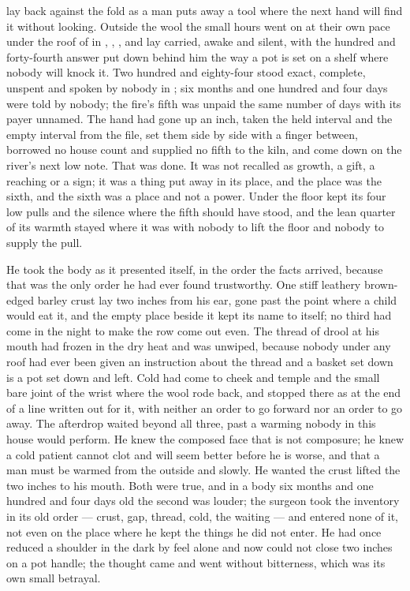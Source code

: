 
 lay back against the fold as a man puts away a tool where the next hand will find it without looking. Outside the wool the small hours went on at their own pace under the roof of  in , , , and  lay carried, awake and silent, with the hundred and forty-fourth answer put down behind him the way a pot is set on a shelf where nobody will knock it. Two hundred and eighty-four stood exact, complete, unspent and spoken by nobody in ; six months and one hundred and four days were told by nobody; the fire's fifth was unpaid the same number of days with its payer unnamed. The hand had gone up an inch, taken the held interval and the empty interval from the file, set them side by side with a finger between, borrowed no house count and supplied no fifth to the kiln, and come down on the river's next low note. That was done. It was not recalled as growth, a gift, a reaching or a sign; it was a thing put away in its place, and the place was the sixth, and the sixth was a place and not a power. Under the floor  kept its four low pulls and the silence where the fifth should have stood, and the lean quarter of its warmth stayed where it was with nobody to lift the floor and nobody to supply the pull.

He took the body as it presented itself, in the order the facts arrived, because that was the only order he had ever found trustworthy. One stiff leathery brown-edged barley crust lay two inches from his ear, gone past the point where a child would eat it, and the empty place beside it kept its name to itself; no third had come in the night to make the row come out even. The thread of drool at his mouth had frozen in the dry heat and was unwiped, because nobody under any roof had ever been given an instruction about the thread and a basket set down is a pot set down and left. Cold had come to cheek and temple and the small bare joint of the wrist where the wool rode back, and stopped there as at the end of a line written out for it, with neither an order to go forward nor an order to go away. The afterdrop waited beyond all three, past a warming nobody in this house would perform. He knew the composed face that is not composure; he knew a cold patient cannot clot and will seem better before he is worse, and that a man must be warmed from the outside and slowly. He wanted the crust lifted the two inches to his mouth. Both were true, and in a body six months and one hundred and four days old the second was louder; the surgeon took the inventory in its old order --- crust, gap, thread, cold, the waiting --- and entered none of it, not even on the place where he kept the things he did not enter. He had once reduced a shoulder in the dark by feel alone and now could not close two inches on a pot handle; the thought came and went without bitterness, which was its own small betrayal.

